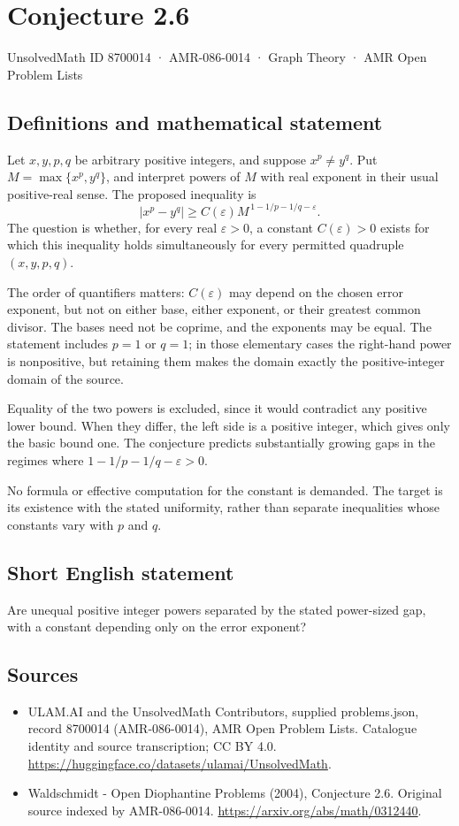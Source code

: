 \documentclass[11pt,a4paper]{article}
\begin{document}
\section*{Conjecture 2.6}\label{8700014}
{\small UnsolvedMath ID 8700014 · AMR-086-0014 · Graph Theory · AMR Open Problem Lists}
\subsection{Definitions and mathematical statement}
Let $x,y,p,q$ be arbitrary positive integers, and suppose $x^p\ne y^q$. Put $M=\max\{x^p,y^q\}$, and interpret powers of $M$ with real exponent in their usual positive-real sense. The proposed inequality is
\[
|x^p-y^q|\ge C(\varepsilon)
M^{\,1-1/p-1/q-\varepsilon}.
\]
The question is whether, for every real $\varepsilon>0$, a constant $C(\varepsilon)>0$ exists for which this inequality holds simultaneously for every permitted quadruple $(x,y,p,q)$.

The order of quantifiers matters: $C(\varepsilon)$ may depend on the chosen error exponent, but not on either base, either exponent, or their greatest common divisor. The bases need not be coprime, and the exponents may be equal. The statement includes $p=1$ or $q=1$; in those elementary cases the right-hand power is nonpositive, but retaining them makes the domain exactly the positive-integer domain of the source.

Equality of the two powers is excluded, since it would contradict any positive lower bound. When they differ, the left side is a positive integer, which gives only the basic bound one. The conjecture predicts substantially growing gaps in the regimes where $1-1/p-1/q-\varepsilon>0$.

No formula or effective computation for the constant is demanded. The target is its existence with the stated uniformity, rather than separate inequalities whose constants vary with $p$ and $q$.
\subsection{Short English statement}
Are unequal positive integer powers separated by the stated power-sized gap, with a constant depending only on the error exponent?
\subsection{Sources}
\begin{itemize}
\item[S1] ULAM.AI and the UnsolvedMath Contributors, supplied problems.json, record 8700014 (AMR-086-0014), AMR Open Problem Lists. Catalogue identity and source transcription; CC BY 4.0.
\url{https://huggingface.co/datasets/ulamai/UnsolvedMath}.
\item[S2] Waldschmidt - Open Diophantine Problems (2004), Conjecture 2.6. Original source indexed by AMR-086-0014.
\url{https://arxiv.org/abs/math/0312440}.
\end{itemize}
\end{document}
